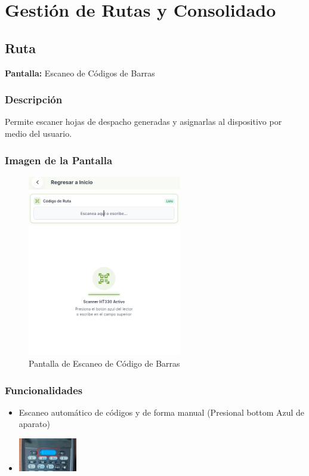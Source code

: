 \documentclass[12pt,a4paper]{report}
\begin{document}
\chapter{Gestión de Rutas y Consolidado}

\section{Ruta}

\begin{pantallabox}
\textbf{Pantalla:} Escaneo de Códigos de Barras \\
\end{pantallabox}

\subsection{Descripción}
Permite escaner hojas de despacho generadas y asignarlas al dispositivo por medio del usuario.
\subsection{Imagen de la Pantalla}
\begin{figure}[H]
    \centering
      \includegraphics[width=0.6\textwidth]{pantallas/pantallaEscaneo.png} 
    \caption{Pantalla de Escaneo de Código de Barras}
    \label{fig:scan_barcode}
\end{figure}

\subsection{Funcionalidades}
\begin{caracteristicabox}
\begin{itemize}[leftmargin=*]
    \item Escaneo automático de códigos y de forma manual (Presional bottom Azul de aparato)
    \item \includegraphics[width=0.2\textwidth]{pantallas/btonAzul.png}
\end{itemize}
\end{caracteristicabox}
\end{document}
